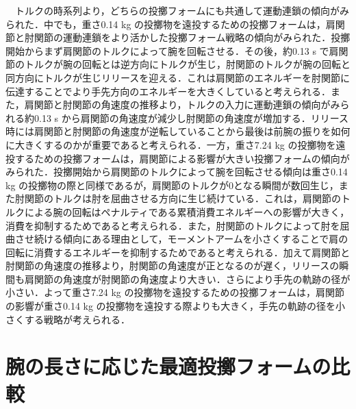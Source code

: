 　トルクの時系列より，どちらの投擲フォームにも共通して運動連鎖の傾向がみられた．中でも，重さ0.14 kg の投擲物を遠投するための投擲フォームは，肩関節と肘関節の運動連鎖をより活かした投擲フォーム戦略の傾向がみられた．投擲開始からまず肩関節のトルクによって腕を回転させる．その後，約0.13 s で肩関節のトルクが腕の回転とは逆方向にトルクが生じ，肘関節のトルクが腕の回転と同方向にトルクが生じリリースを迎える．これは肩関節のエネルギーを肘関節に伝達することでより手先方向のエネルギーを大きくしていると考えられる．また，肩関節と肘関節の角速度の推移より，トルクの入力に運動連鎖の傾向がみられる約0.13 s から肩関節の角速度が減少し肘関節の角速度が増加する．リリース時には肩関節と肘関節の角速度が逆転していることから最後は前腕の振りを如何に大きくするのかが重要であると考えられる．一方，重さ7.24 kg の投擲物を遠投するための投擲フォームは，肩関節による影響が大きい投擲フォームの傾向がみられた．投擲開始から肩関節のトルクによって腕を回転させる傾向は重さ0.14 kg の投擲物の際と同様であるが，肩関節のトルクが0となる瞬間が数回生じ，また肘関節のトルクは肘を屈曲させる方向に生じ続けている．これは，肩関節のトルクによる腕の回転はペナルティである累積消費エネルギーへの影響が大きく，消費を抑制するためであると考えられる．また，肘関節のトルクによって肘を屈曲させ続ける傾向にある理由として，モーメントアームを小さくすることで肩の回転に消費するエネルギーを抑制するためであると考えられる．加えて肩関節と肘関節の角速度の推移より，肘関節の角速度が正となるのが遅く，リリースの瞬間も肩関節の角速度が肘関節の角速度より大きい．さらにより手先の軌跡の径が小さい．よって重さ7.24 kg の投擲物を遠投するための投擲フォームは，肩関節の影響が重さ0.14 kg の投擲物を遠投する際よりも大きく，手先の軌跡の径を小さくする戦略が考えられる．\\

\clearpage
{}

\clearpage
\section{腕の長さに応じた最適投擲フォームの比較}
